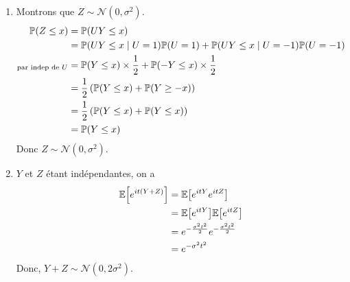 {\begin{td-sol}[]
\begin{enumerate}
            \item Montrons que \(Z \sim \mathcal N(0,\sigma^2)\).
            \begin{equation*}
                \begin{aligned}
                    \mathbb{P}(Z \leq x)
                    &= \mathbb{P}(UY \leq x)\\
                    &= \mathbb{P}(UY\leq x \mid U=1) \mathbb{P}(U=1) 
                    + \mathbb{P}(UY\leq x \mid U=-1) \mathbb{P}(U=-1)\\
                    {}_{\text{par indep de }U}&= \mathbb{P}(Y\leq x) \times \frac{1}{2} + \mathbb{P}(-Y\leq x) \times \frac{1}{2}\\
                    &= \frac{1}{2} \left(\mathbb{P}(Y\leq x) + \mathbb{P}(Y\geq -x)\right)\\
                    &= \frac{1}{2} \left(\mathbb{P}(Y\leq x) + \mathbb{P}(Y\leq x)\right)\\
                    &= \mathbb{P}(Y\leq x)
                \end{aligned}
            \end{equation*}
            Donc \(Z \sim \mathcal N(0,\sigma^2)\).

            \item \(Y\) et \(Z\) étant indépendantes, on a
            \begin{equation*}
                \begin{aligned}
                    \mathbb{E}\mathopen{}\left[e^{it(Y+Z)}\right]\mathclose{}
                    &= \mathbb{E}\mathopen{}\left[e^{itY}e^{itZ}\right]\mathclose{}\\
                    &= \mathbb{E}\mathopen{}\left[e^{itY}\right]\mathclose{}\mathbb{E}\mathopen{}\left[e^{itZ}\right]\mathclose{}\\
                    &= e^{-\frac{\sigma^2t^2}{2}}e^{-\frac{\sigma^2t^2}{2}}\\
                    &= e^{-\sigma^2t^2}
                \end{aligned}
            \end{equation*}
            Donc, \(Y + Z \sim \mathcal N(0,2\sigma^2)\).
        \end{enumerate}
    \end{td-sol}
}{}
